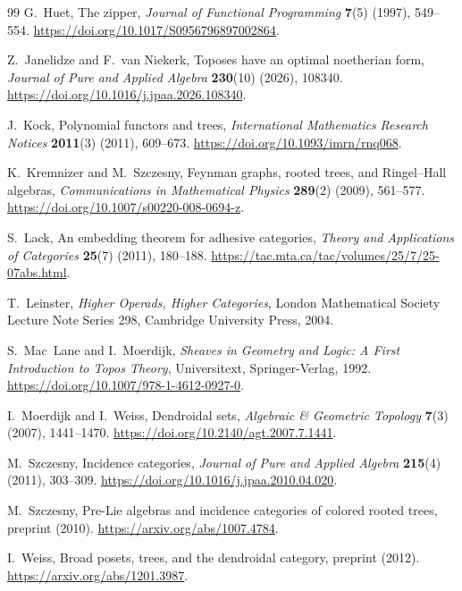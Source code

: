 \documentclass[11pt,a4paper]{article}
\theoremstyle{plain}
\theoremstyle{definition}
\theoremstyle{remark}
\begin{document}
\begin{thebibliography}{99}
G.~Huet, The zipper,
\emph{Journal of Functional Programming} \textbf{7}(5) (1997), 549--554.
\url{https://doi.org/10.1017/S0956796897002864}.


Z.~Janelidze and F.~van Niekerk,
Toposes have an optimal noetherian form,
\emph{Journal of Pure and Applied Algebra} \textbf{230}(10) (2026), 108340.
\url{https://doi.org/10.1016/j.jpaa.2026.108340}.

J.~Kock, Polynomial functors and trees,
\emph{International Mathematics Research Notices} \textbf{2011}(3) (2011),
609--673.
\url{https://doi.org/10.1093/imrn/rnq068}.

K.~Kremnizer and M.~Szczesny,
Feynman graphs, rooted trees, and Ringel--Hall algebras,
\emph{Communications in Mathematical Physics} \textbf{289}(2) (2009),
561--577.
\url{https://doi.org/10.1007/s00220-008-0694-z}.

S.~Lack, An embedding theorem for adhesive categories,
\emph{Theory and Applications of Categories} \textbf{25}(7) (2011), 180--188.
\url{https://tac.mta.ca/tac/volumes/25/7/25-07abs.html}.

T.~Leinster,
\emph{Higher Operads, Higher Categories},
London Mathematical Society Lecture Note Series 298,
Cambridge University Press, 2004.

S.~Mac~Lane and I.~Moerdijk,
\emph{Sheaves in Geometry and Logic: A First Introduction to Topos Theory},
Universitext, Springer-Verlag, 1992.
\url{https://doi.org/10.1007/978-1-4612-0927-0}.

I.~Moerdijk and I.~Weiss, Dendroidal sets,
\emph{Algebraic \& Geometric Topology} \textbf{7}(3) (2007), 1441--1470.
\url{https://doi.org/10.2140/agt.2007.7.1441}.

M.~Szczesny, Incidence categories,
\emph{Journal of Pure and Applied Algebra} \textbf{215}(4) (2011),
303--309.
\url{https://doi.org/10.1016/j.jpaa.2010.04.020}.

M.~Szczesny, Pre-Lie algebras and incidence categories of colored
rooted trees, preprint (2010).
\url{https://arxiv.org/abs/1007.4784}.

I.~Weiss, Broad posets, trees, and the dendroidal category,
preprint (2012).
\url{https://arxiv.org/abs/1201.3987}.

\end{thebibliography}
\end{document}
